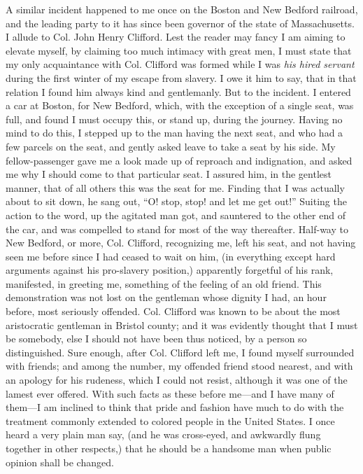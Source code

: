 A similar incident happened to me once on the Boston and New Bedford
railroad, and the leading party to it has since been governor of the
state of Massachusetts. I allude to Col. John Henry Clifford. Lest the
reader may fancy I am aiming to elevate myself, by claiming too much
intimacy with great men, I must state that my only acquaintance with
Col. Clifford was formed while I was \emph{his hired servant} during the
first winter of my escape from slavery. I owe it him to say, that in
that relation I found him {}always kind and gentlemanly. But to the
incident. I entered a car at Boston, for New Bedford, which, with the
exception of a single seat, was full, and found I must occupy this, or
stand up, during the journey. Having no mind to do this, I stepped up to
the man having the next seat, and who had a few parcels on the seat, and
gently asked leave to take a seat by his side. My fellow-passenger gave
me a look made up of reproach and indignation, and asked me why I should
come to that particular seat. I assured him, in the gentlest manner,
that of all others this was the seat for me. Finding that I was actually
about to sit down, he sang out, ``O! stop, stop! and let me get out!''
Suiting the action to the word, up the agitated man got, and sauntered
to the other end of the car, and was compelled to stand for most of the
way thereafter. Half-way to New Bedford, or more, Col. Clifford,
recognizing me, left his seat, and not having seen me before since I had
ceased to wait on him, (in everything except hard arguments against his
pro-slavery position,) apparently forgetful of his rank, manifested, in
greeting me, something of the feeling of an old friend. This
demonstration was not lost on the gentleman whose dignity I had, an hour
before, most seriously offended. Col. Clifford was known to be about the
most aristocratic gentleman in Bristol county; and it was evidently
thought that I must be somebody, else I should not have been thus
noticed, by a person so distinguished. Sure enough, after Col. Clifford
left me, I found myself surrounded with friends; and among the number,
my offended friend stood nearest, and with an apology for his rudeness,
{}which I could not resist, although it was one of the lamest ever
offered. With such facts as these before me---and I have many of
them---I am inclined to think that pride and fashion have much to do
with the treatment commonly extended to colored people in the United
States. I once heard a very plain man say, (and he was cross-eyed, and
awkwardly flung together in other respects,) that he should be a
handsome man when public opinion shall be changed.

